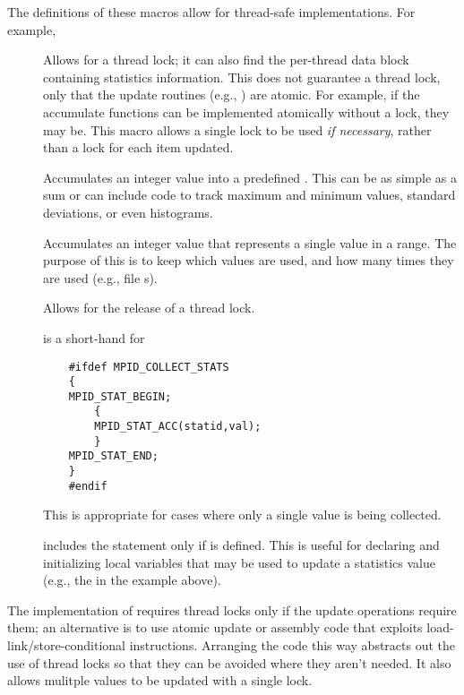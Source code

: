 \documentclass{article}
\begin{document}
The definitions of these macros allow for thread-safe
implementations.  For example,
\begin{description}
\item[]Allows for a thread lock; it can also find the 
per-thread data block containing statistics information.  This does
not guarantee a thread lock, only that the update routines (e.g.,
) are atomic.  For example, if the accumulate
functions can be implemented atomically without a lock, they may be.
This macro allows a single lock to be used \emph{if necessary}, rather
than a lock for each item updated.

\item[]Accumulates an integer value into a predefined
.  This can be as simple as a sum or can include code to
track maximum and minimum values, standard deviations, or even
histograms. 

\item[]Accumulates an integer value that
represents a single value in a range.  The purpose of this is to keep
which values are used, and how many times they are used (e.g.,
file s).

\item[]Allows for the release of a thread lock.

\item[]is a short-hand for 
\begin{verbatim}
    #ifdef MPID_COLLECT_STATS
    {
    MPID_STAT_BEGIN;
        {
        MPID_STAT_ACC(statid,val);
        }
    MPID_STAT_END;
    }
    #endif
\end{verbatim}
This is appropriate for cases where only a single value is being
collected.

\item[]includes the statement only if
 is defined.  This is useful for declaring and
initializing local variables that may be used to update a statistics
value (e.g., the  in the example above).
\end{description}

The implementation of  requires thread locks
only if the update operations require 
them; an alternative is to use atomic update or assembly code that
exploits load-link/store-conditional instructions.  Arranging the code
this way abstracts out the use of thread locks so that they can be
avoided where they aren't needed.  It also allows mulitple 
values to be updated with a single lock.
\end{document}
